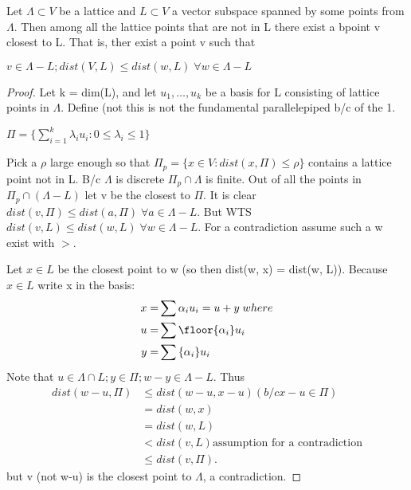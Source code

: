 \begin{lemma}
Let $\Lambda \subset V$ be a lattice and $L \subset V$ a vector subspace spanned by some points from $\Lambda$. Then among all the lattice points that are not in L there exist a bpoint v closest to L. That is, ther exist a point v such that

$v \in \Lambda - L; dist(V, L) \leq dist(w, L) \; \forall w \in \Lambda - L$

\begin{proof}
Let k = dim(L), and let $u_1, \dots, u_k$ be a basis for L consisting of lattice points in $\Lambda$. Define (not this is not the fundamental parallelepiped b/c of the 1.
\begin{center}
	$\Pi = \{ \sum_{i=1}^{k} \lambda_i u_i: 0 \leq \lambda_i \leq 1 \}$
\end{center}
Pick a $\rho$ large enough so that $\Pi_p = \{ x \in V : dist(x, \Pi) \leq \rho \}$ contains a lattice point not in L. B/c $\Lambda$ is discrete $\Pi_p \cap \Lambda$ is finite. Out of all the points in  $\Pi_p \cap (\Lambda - L)$ let v be the closest to $\Pi$. It is clear $dist(v, \Pi) \leq dist(a, \Pi) \; \forall a \in \Lambda - L$. But WTS $dist(v, L) \leq dist(w, L) \; \forall w \in \Lambda - L$. For a contradiction assume such a w exist with $>$.

Let $x\in L$ be the closest point to w (so then dist(w, x) = dist(w, L)). Because $x \in L$ write x in the basis:
\begin{align*}
	x = & \sum \alpha_i u_i = u + y \; where \\
	u = & \sum \floor{\alpha_i} u_i  \\
	y = & \sum \floorc{\alpha_i} u_i  
\end{align*}
Note that $u \in \Lambda \cap L; y \in \Pi; w - y \in \Lambda - L$. Thus
\begin{align*}
	dist(w - u, \Pi) & \leq dist(w - u, x - u) (b/c x-u \in \Pi) \\
				  & = dist(w, x) \\
				  & = dist(w, L) \\
				 &  < dist(v, L) \text{assumption for a contradiction} \\
				& \leq dist(v, \Pi).
\end{align*}
but v (not w-u) is the closest point to $\Lambda$, a contradiction.
\end{proof}
\end{lemma}


